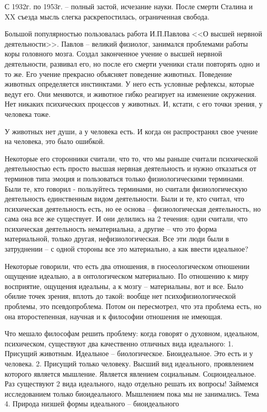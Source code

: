С 1932г. по 1953г. – полный застой, исчезание науки. После смерти Сталина и XX съезда мысль слегка раскрепостилась, ограниченная свобода.

Большой популярностью пользовалась работа И.П.Павлова <<О высшей нервной деятельности>>. Павлов – великий физиолог, занимался проблемами работы коры головного мозга. Создал законченное учение о высшей нервной деятельности, развивал его, но после его смерти ученики стали повторять одно и то же. Его учение прекрасно объясняет поведение животных. Поведение животных определяется инстинктами. У него есть условные рефлексы, которые ведут его. Они меняются, и животное гибко реагирует на изменение окружения. Нет никаких психических процессов у животных. И, кстати, с его точки зрения, у человека тоже.

У животных нет души, а у человека есть. И когда он распространял свое учение на человека, это было ошибкой.

Некоторые его сторонники считали, что то, что мы раньше считали психической деятельностью есть просто высшая нервная деятельность и нужно отказаться от терминов типа эмоция и пользоваться только физиологическими терминами. Были те, кто говорил - пользуйтесь терминами, но считали физиологическую деятельность единственным видом деятельности. Были и те, кто считал, что психическая деятельность есть, но ее основа – физиологическая деятельность, но сама она все же существует. И они делились на 2 течения: одни считали, что психическая деятельность нематериальна, а другие – что это форма материальной, только другая, нефизиологическая. Все эти люди были в затруднении – с одной стороны все это материально, а как ввести идеальное?

Некоторые говорили, что есть два отношения, в гносеологическом отношении ощущение идеально, а в онтологическом материально. По отношению к миру восприятие, ощущения идеальны, а к мозгу – материальны, вот и все. Было обилие точек зрения, вплоть до такой: вообще нет психофизиологической проблемы, это псевдопроблема. Потом он пересмотрел, что эта проблема есть, но она второстепенная, научная и к философии отношения не имеющая.

Что мешало философам решить проблему: когда говорят о духовном, идеальном, психическом, существуют два качественно отличных вида идеального: 1. Присущий животным. Идеальное – биологическое. Биоидеальное. Это есть и у человека. 2. Присущий только человеку. Высший вид идеального, проявлением которого является мышление. Является явлением социальным. Социоидеальное. Раз существуют 2 вида идеального, надо отдельно решать их вопросы! Займемся исследованием только биоидеального. Мышлением пока мы не занимались.
Тема 4. Природа низшей формы идеального – биоидеального

